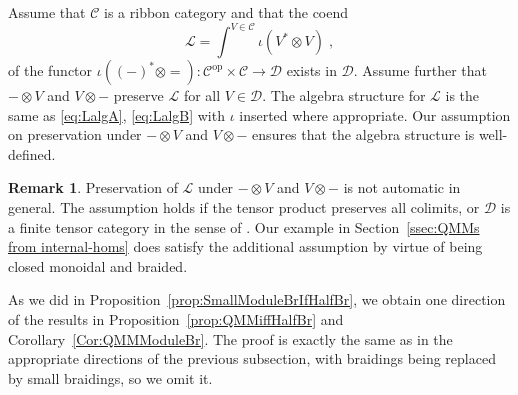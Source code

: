 \documentclass[12pt,dvipsnames]{article}
\numberwithin{equation}{section}
\theoremstyle{definition}
\newtheorem{remark}[definition]{Remark}
\newcommand{\cat}[1]{\mathcal{#1}}
\newcommand{\1}{\ensuremath{\mathbbm{1}}}
\newcommand{\blank}{{-}}
\newcommand{\bblank}{{=}}
\begin{document}
Assume that $\cat{C}$ is a ribbon category and that the coend 
\begin{equation}
    \mathcal{L} = \int^{V\in\cat{C}} \iota(V^\ast\otimes V) \;,
\end{equation}
of the functor $\iota((\blank)^\ast\otimes\bblank):\cat{C}^{\mathrm{op}}\times\cat{C} \to \cat{D}$ exists in $\cat{D}$. 
Assume further that $\blank\otimes V$ and $V\otimes\blank$ preserve $\mathcal{L}$ for all $V\in\cat{D}$. The algebra structure for $\mathcal{L}$ is the same as \eqref{eq:LalgA}, \eqref{eq:LalgB} with $\iota$ inserted where appropriate.
Our assumption on preservation under $\blank\otimes V$ and $V\otimes\blank$ ensures that the algebra structure is well-defined.
\begin{remark}
    Preservation of $\mathcal{L}$ under $\blank\otimes V$ and $V\otimes\blank$ is not automatic in general. The assumption holds if the tensor product preserves all colimits, or $\cat{D}$ is a finite tensor category in the sense of \cite[Ch.\,4]{EGNO15}. Our example in Section~\ref{ssec:QMMs from internal-homs}
does satisfy the additional assumption by virtue of being closed monoidal and braided.
\end{remark}
As we did in Proposition~\ref{prop:SmallModuleBrIfHalfBr}, we obtain one direction of the results in Proposition~\ref{prop:QMMiffHalfBr} and Corollary~\ref{Cor:QMMModuleBr}. The proof is exactly the same as in the appropriate directions of the previous subsection, with braidings being replaced by small braidings, so we omit it.
\end{document}
